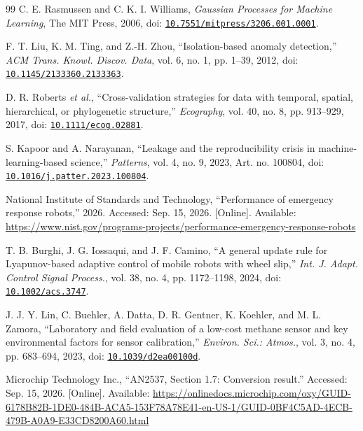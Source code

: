 \documentclass[11pt,a4paper]{article}
\begin{document}
\begin{thebibliography}{99}
C. E. Rasmussen and C. K. I. Williams, \textit{Gaussian Processes for Machine Learning}, The MIT Press, 2006, doi: \href{https://doi.org/10.7551/mitpress/3206.001.0001}{\nolinkurl{10.7551/mitpress/3206.001.0001}}.

F. T. Liu, K. M. Ting, and Z.-H. Zhou, “Isolation-based anomaly detection,” \textit{ACM Trans. Knowl. Discov. Data}, vol. 6, no. 1, pp. 1--39, 2012, doi: \href{https://doi.org/10.1145/2133360.2133363}{\nolinkurl{10.1145/2133360.2133363}}.

D. R. Roberts \textit{et al.}, “Cross-validation strategies for data with temporal, spatial, hierarchical, or phylogenetic structure,” \textit{Ecography}, vol. 40, no. 8, pp. 913--929, 2017, doi: \href{https://doi.org/10.1111/ecog.02881}{\nolinkurl{10.1111/ecog.02881}}.

S. Kapoor and A. Narayanan, “Leakage and the reproducibility crisis in machine-learning-based science,” \textit{Patterns}, vol. 4, no. 9, 2023, Art. no. 100804, doi: \href{https://doi.org/10.1016/j.patter.2023.100804}{\nolinkurl{10.1016/j.patter.2023.100804}}.

National Institute of Standards and Technology, “Performance of emergency response robots,” 2026. Accessed: Sep. 15, 2026. [Online]. Available: \url{https://www.nist.gov/programs-projects/performance-emergency-response-robots}

T. B. Burghi, J. G. Iossaqui, and J. F. Camino, “A general update rule for Lyapunov-based adaptive control of mobile robots with wheel slip,” \textit{Int. J. Adapt. Control Signal Process.}, vol. 38, no. 4, pp. 1172--1198, 2024, doi: \href{https://doi.org/10.1002/acs.3747}{\nolinkurl{10.1002/acs.3747}}.

J. J. Y. Lin, C. Buehler, A. Datta, D. R. Gentner, K. Koehler, and M. L. Zamora, “Laboratory and field evaluation of a low-cost methane sensor and key environmental factors for sensor calibration,” \textit{Environ. Sci.: Atmos.}, vol. 3, no. 4, pp. 683--694, 2023, doi: \href{https://doi.org/10.1039/d2ea00100d}{\nolinkurl{10.1039/d2ea00100d}}.

Microchip Technology Inc., “AN2537, Section 1.7: Conversion result.” Accessed: Sep. 15, 2026. [Online]. Available: \url{https://onlinedocs.microchip.com/oxy/GUID-6178B82B-1DE0-484B-ACA5-153F78A78E41-en-US-1/GUID-0BF4C5AD-4ECB-479B-A0A9-E33CD8200A60.html}


\end{thebibliography}
\end{document}

